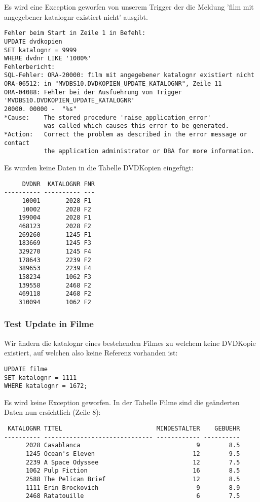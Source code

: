 \documentclass[11pt,a4paper,parskip=half]{scrartcl}
\begin{document}
Es wird eine Exception geworfen von unserem Trigger der die Meldung 'film mit angegebener katalognr existiert nicht' ausgibt.

\begin{lstlisting}
Fehler beim Start in Zeile 1 in Befehl:
UPDATE dvdkopien
SET katalognr = 9999
WHERE dvdnr LIKE '1000%'
Fehlerbericht:
SQL-Fehler: ORA-20000: film mit angegebener katalognr existiert nicht
ORA-06512: in "MVDBS10.DVDKOPIEN_UPDATE_KATALOGNR", Zeile 11
ORA-04088: Fehler bei der Ausfuehrung von Trigger 'MVDBS10.DVDKOPIEN_UPDATE_KATALOGNR'
20000. 00000 -  "%s"
*Cause:    The stored procedure 'raise_application_error'
           was called which causes this error to be generated.
*Action:   Correct the problem as described in the error message or contact
           the application administrator or DBA for more information.
\end{lstlisting}

Es wurden keine Daten in die Tabelle DVDKopien eingefügt:

\begin{lstlisting}
     DVDNR  KATALOGNR FNR
---------- ---------- ---
     10001       2028 F1  
     10002       2028 F2  
    199004       2028 F1  
    468123       2028 F2  
    269260       1245 F1  
    183669       1245 F3  
    329270       1245 F4  
    178643       2239 F2  
    389653       2239 F4  
    158234       1062 F3  
    139558       2468 F2  
    469118       2468 F2  
    310094       1062 F2  
\end{lstlisting}

\subsubsection{Test Update in Filme}
Wir ändern die katalognr eines bestehenden Filmes zu welchem keine DVDKopie existiert, auf welchen also keine Referenz vorhanden ist:

\begin{lstlisting}
UPDATE filme
SET katalognr = 1111
WHERE katalognr = 1672;
\end{lstlisting}

Es wird keine Exception geworfen. In der Tabelle Filme sind die geänderten Daten nun ersichtlich (Zeile 8):

\begin{lstlisting}
 KATALOGNR TITEL                          MINDESTALTER    GEBUEHR
---------- ------------------------------ ------------ ----------
      2028 Casablanca                                9        8.5 
      1245 Ocean's Eleven                           12        9.5 
      2239 A Space Odyssee                          12        7.5 
      1062 Pulp Fiction                             16        8.5 
      2588 The Pelican Brief                        12        8.5 
      1111 Erin Brockovich                           9        8.9 
      2468 Ratatouille                               6        7.5 
\end{lstlisting}
\end{document}
